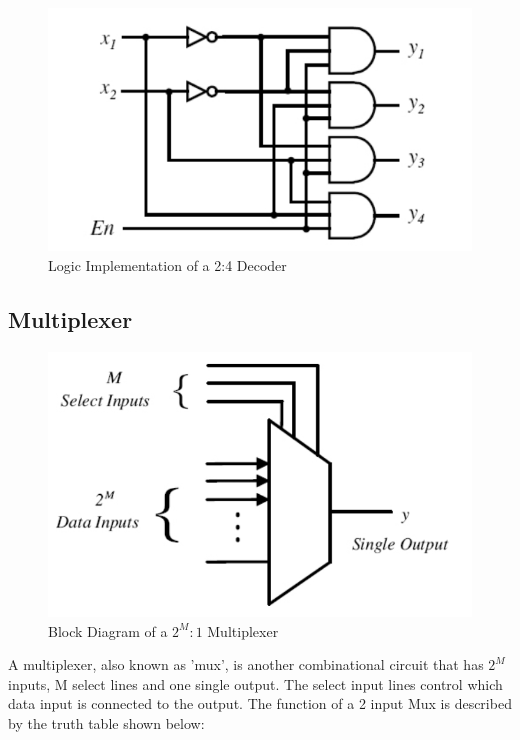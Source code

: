 \begin{figure}[H]
  \begin{centering}
  \includegraphics[scale=1]{data/decoderlogic.png}
  \par\end{centering}
  \caption{Logic Implementation of a 2:4 Decoder}
\end{figure}


\subsection*{Multiplexer}

\begin{figure}[H]
  \begin{centering}
  \includegraphics[scale=1]{data/muxB.png}
  \par\end{centering}
  \caption{Block Diagram of a $2^{M}:1$ Multiplexer}
\end{figure}

A multiplexer, also known as 'mux', is another combinational circuit that has $2^{M}$ inputs, M select lines and one single output. The select input lines control which data input is connected to the output. The function of a 2 input Mux is described by the truth table shown below:



